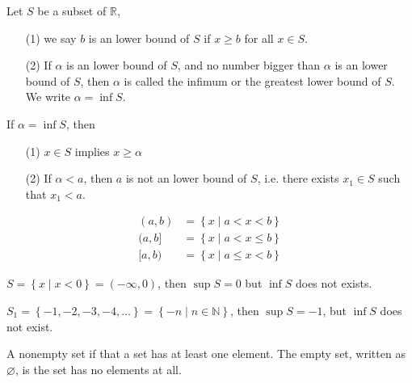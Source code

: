 \begin{definition}
  Let \(S\) be a subset of \(\mathbb{R} \), 
  \begin{itemize}
    \item [(1)] we say \(b\) is an lower bound of \(S\) if \(x \ge b\) for all \(x \in S\). 
    \item [(2)] If \(\alpha \) is an lower bound of \(S\), and no number bigger than \(\alpha \) is an lower bound of \(S\), then \(\alpha \) is called the infimum or the greatest lower bound of \(S\). We write \(\alpha  = \inf S\).          
  \end{itemize}  
\end{definition}

\begin{corollary}
  If \(\alpha  = \inf S\), then 
  \begin{itemize}
    \item [(1)] \(x \in S\) implies \(x \ge \alpha \)
    \item [(2)] If \(\alpha  < a\), then \(a\) is not an lower bound of \(S\), i.e. there exists \(x_1 \in S\) such that \(x_1 < a\).       
  \end{itemize} 
\end{corollary}

\begin{notation}
 \begin{align*}
  (a, b) &= \left\{ x \mid a < x < b \right\} \\
  (a,b] &= \left\{ x \mid a < x \le b \right\} \\ 
  [a, b) &= \left\{ x \mid a \le x < b \right\}  
 \end{align*}
\end{notation}

\begin{eg}
  \(S = \left\{ x \mid x<0 \right\} = (-\infty , 0)\), then \(\sup S = 0\) but \(\inf S\) does not exists.    
\end{eg}

\begin{eg}
  \(S_1 = \left\{ -1, -2, -3, -4, \dots  \right\} = \left\{ -n \mid n \in \mathbb{N}  \right\}  \), then \(\sup S = -1\), but \(\inf S\) does not exist.    
\end{eg}

\begin{definition}
  A nonempty set if that a set has at least one element. The empty set, written as \(\varnothing \), is the set has no elements at all. 
\end{definition}


